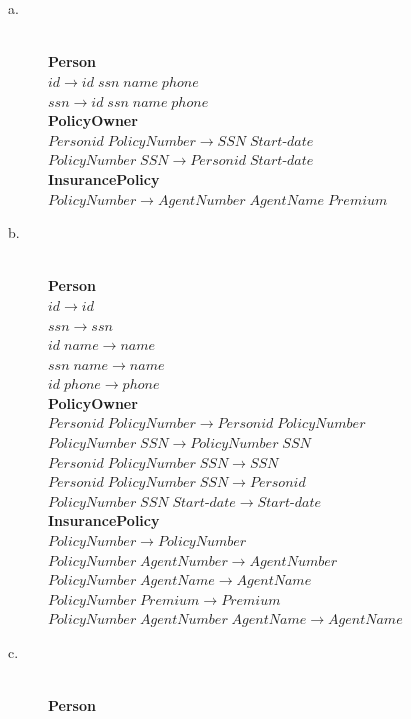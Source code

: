 \documentclass{article}
\begin{document}
\section{}
\begin{description}
\item[a.]
\textbf{\\Person\\}
$id \rightarrow id\; ssn\; name\; phone$\\
$ssn \rightarrow id\; ssn\; name\; phone$\\
\textbf{PolicyOwner\\}
$Personid\; PolicyNumber \rightarrow SSN\; Start$-$date$\\
$PolicyNumber\; SSN \rightarrow Personid\; Start$-$date$\\
\textbf{InsurancePolicy\\}
$PolicyNumber \rightarrow AgentNumber\; AgentName\; Premium$
\item[b.]
\textbf{\\Person\\}
$id \rightarrow id$\\
$ssn \rightarrow ssn$\\
$id\; name \rightarrow name$\\
$ssn\; name \rightarrow name$\\
$id\; phone \rightarrow phone$\\
\textbf{PolicyOwner\\}
$Personid\; PolicyNumber \rightarrow Personid\; PolicyNumber$\\
$PolicyNumber\; SSN \rightarrow PolicyNumber\; SSN$\\
$Personid\; PolicyNumber\; SSN \rightarrow SSN$\\
$Personid\; PolicyNumber\; SSN \rightarrow Personid$\\
$PolicyNumber\; SSN\; Start$-$date \rightarrow Start$-$date$\\
\textbf{InsurancePolicy\\}
$PolicyNumber \rightarrow PolicyNumber$\\
$PolicyNumber\; AgentNumber \rightarrow AgentNumber$\\
$PolicyNumber\; AgentName \rightarrow AgentName$\\
$PolicyNumber\; Premium \rightarrow Premium$\\
$PolicyNumber\; AgentNumber\; AgentName \rightarrow AgentName$\\
\item[c.]
\textbf{\\Person\\}

\end{description}
\end{document}
